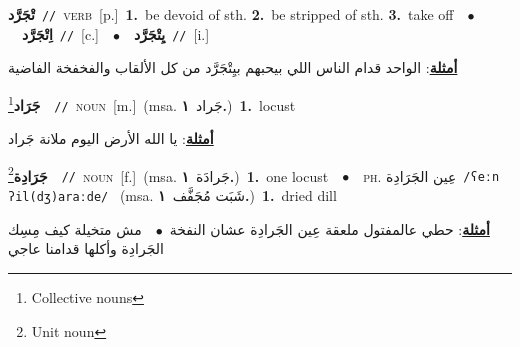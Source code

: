 \documentclass[10pt,a4paper,twoside]{article} %
\begin{document}
\begin{multicols}{2}
{\setlength\topsep{0pt}\textbf{\foreignlanguage{arabic}{تْجَرَّد}}\ {\color{gray}\texttt{//}\color{black}}\ \textsc{verb}\ [p.]\ \textbf{1.}~be devoid of sth.  \textbf{2.}~be stripped of sth.  \textbf{3.}~take off\ \ $\bullet$\ \ \setlength\topsep{0pt}\textbf{\foreignlanguage{arabic}{اِتْجَرَّد}}\ {\color{gray}\texttt{//}\color{black}}\ [c.]\ \ $\bullet$\ \ \setlength\topsep{0pt}\textbf{\foreignlanguage{arabic}{يِتْجَرَّد}}\ {\color{gray}\texttt{//}\color{black}}\ [i.]\  \begin{flushright}\color{gray}\foreignlanguage{arabic}{\textbf{\underline{\foreignlanguage{arabic}{أمثلة}}}: الواحد قدام الناس اللي بيحبهم بيِتْجَرَّد من كل الألقاب والفخفخة الفاضية}\end{flushright}\color{black}} \vspace{2mm}

{\setlength\topsep{0pt}\textbf{\foreignlanguage{arabic}{جَرَاد}}\footnote{Collective nouns}\ \ {\color{gray}\texttt{//}\color{black}}\ \textsc{noun}\ [m.]\ \color{gray}(msa. \foreignlanguage{arabic}{جَراد}~\foreignlanguage{arabic}{\textbf{١.}})\color{black}\ \textbf{1.}~locust\  \begin{flushright}\color{gray}\foreignlanguage{arabic}{\textbf{\underline{\foreignlanguage{arabic}{أمثلة}}}: يا الله الأرض اليوم ملانة جَراد}\end{flushright}\color{black}} \vspace{2mm}

{\setlength\topsep{0pt}\textbf{\foreignlanguage{arabic}{جَرَادِة}}\footnote{Unit noun}\ \ {\color{gray}\texttt{//}\color{black}}\ \textsc{noun}\ [f.]\ \color{gray}(msa. \foreignlanguage{arabic}{جَرادَة}~\foreignlanguage{arabic}{\textbf{١.}})\color{black}\ \textbf{1.}~one locust\ \ $\bullet$\ \ \textsc{ph.} \color{gray} \foreignlanguage{arabic}{عِين الجَرَادِة}\color{black}\ {\color{gray}\texttt{/{\sffamily ʕeːn ʔil(dʒ)araːde}/}\color{black}}\ \color{gray} (msa. \foreignlanguage{arabic}{شَبَت مُجَفَّف}~\foreignlanguage{arabic}{\textbf{١.}})\color{black}\ \textbf{1.}~dried dill\  \begin{flushright}\color{gray}\foreignlanguage{arabic}{\textbf{\underline{\foreignlanguage{arabic}{أمثلة}}}: حطي عالمفتول ملعقة عِين الجَرادِة عشان النفخة\ $\bullet$\ \  مش متخيلة كيف مِسِك الجَرادِة وأكلها قدامنا عاجي}\end{flushright}\color{black}} \vspace{2mm}


\end{multicols}
\end{document}
